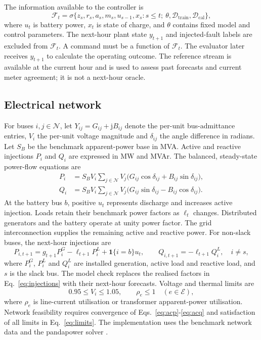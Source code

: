 \documentclass[11pt,a4paper]{article}
\newcommand{\ind}{\mathbf{1}}
\begin{document}
The information available to the controller is
\begin{equation}
\mathcal F_t=\sigma\{z_s,r_s,a_s,m_s,u_{s-1},x_s:s\leq t;\ \theta,\mathcal D_{\mathrm{train}},\mathcal D_{\mathrm{cal}}\},
\label{eq:information}
\end{equation}
where $u_t$ is battery power, $x_t$ is state of charge, and $\theta$ contains fixed model and control parameters. The next-hour plant state $y_{t+1}$ and injected-fault labels are excluded from $\mathcal F_t$. A command must be a function of $\mathcal F_t$. The evaluator later receives $y_{t+1}$ to calculate the operating outcome. The reference stream is available at the current hour and is used to assess past forecasts and current meter agreement; it is not a next-hour oracle.

\subsection{Electrical network}
For buses $i,j\in\mathcal N$, let $Y_{ij}=G_{ij}+\mathrm jB_{ij}$ denote the per-unit bus-admittance entries, $V_i$ the per-unit voltage magnitude and $\delta_{ij}$ the angle difference in radians. Let $S_B$ be the benchmark apparent-power base in MVA. Active and reactive injections $P_i$ and $Q_i$ are expressed in MW and MVAr. The balanced, steady-state power-flow equations are
\begin{align}
P_i&=S_BV_i\sum_{j\in\mathcal N}V_j\big(G_{ij}\cos\delta_{ij}+B_{ij}\sin\delta_{ij}\big),\label{eq:acp}\\
Q_i&=S_BV_i\sum_{j\in\mathcal N}V_j\big(G_{ij}\sin\delta_{ij}-B_{ij}\cos\delta_{ij}\big).\label{eq:acq}
\end{align}
At the battery bus $b$, positive $u_t$ represents discharge and increases active injection. Loads retain their benchmark power factors as $\ell_t$ changes. Distributed generators and the battery operate at unity power factor. The grid interconnection supplies the remaining active and reactive power. For non-slack buses, the next-hour injections are
\begin{equation}
P_{i,t+1}=g_{t+1}P_i^G-\ell_{t+1}P_i^L+\ind\{i=b\}u_t,\qquad
Q_{i,t+1}=-\ell_{t+1}Q_i^L,\quad i\ne s,
\label{eq:injections}
\end{equation}
where $P_i^G$, $P_i^L$ and $Q_i^L$ are installed generation, active load and reactive load, and $s$ is the slack bus. The model check replaces the realised factors in Eq.~\eqref{eq:injections} with their next-hour forecasts. Voltage and thermal limits are
\begin{equation}
0.95\leq V_i\leq1.05,\qquad
\rho_e\leq1\quad(e\in\mathcal E),
\label{eq:limits}
\end{equation}
where $\rho_e$ is line-current utilisation or transformer apparent-power utilisation. Network feasibility requires convergence of Eqs.~\eqref{eq:acp}-\eqref{eq:acq} and satisfaction of all limits in Eq.~\eqref{eq:limits}. The implementation uses the benchmark network data and the pandapower solver \cite{baran,meinecke,thurner}.
\end{document}
